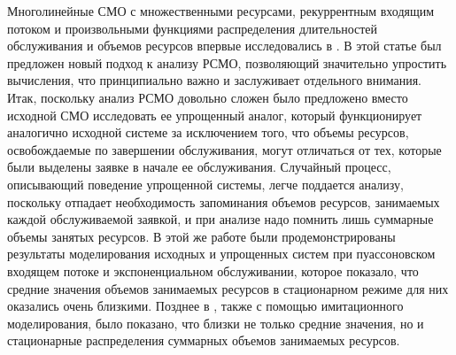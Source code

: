 \documentclass[a4paper,12pt]{article}
\begin{document}
Многолинейные СМО с множественными ресурсами, рекуррентным входящим потоком и произвольными функциями распределения длительностей обслуживания и объемов ресурсов впервые исследовались в \cite{Naumov_1_2014}. В этой статье был предложен новый подход к анализу РСМО,
позволяющий значительно упростить вычисления, что принципиально важно и заслуживает отдельного внимания. Итак, поскольку анализ РСМО довольно сложен
было предложено вместо исходной СМО исследовать ее упрощенный аналог, который функционирует аналогично исходной системе за исключением того, что объемы ресурсов, освобождаемые по завершении обслуживания, могут отличаться от тех, которые были выделены заявке в начале ее обслуживания.
Случайный процесс, описывающий поведение упрощенной системы, легче поддается анализу, поскольку отпадает необходимость запоминания объемов ресурсов, занимаемых каждой обслуживаемой заявкой, и при анализе надо помнить лишь суммарные объемы занятых ресурсов.
В этой же работе были продемонстрированы результаты моделирования исходных и упрощенных систем при пуассоновском входящем потоке и экспоненциальном обслуживании, которое показало,  что средние значения объемов занимаемых ресурсов в стационарном режиме для них оказались очень близкими. Позднее в \cite{Naumov_2_2014}, также с помощью имитационного моделирования, было показано, что близки не только средние значения, но и стационарные распределения суммарных объемов занимаемых ресурсов.
\end{document}
